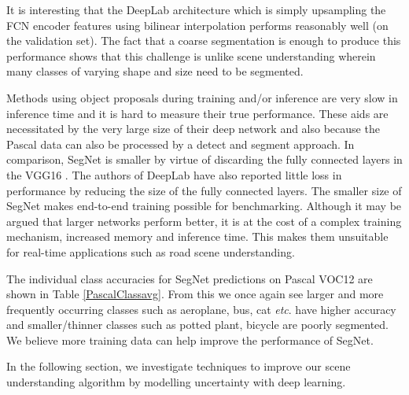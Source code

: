 It is interesting that the DeepLab \citep{chen2016deeplab} architecture which is simply upsampling the FCN encoder features using bilinear interpolation performs reasonably well (on the validation set). The fact that a coarse segmentation is enough to produce this performance shows that this challenge is unlike scene understanding wherein many classes of varying shape and size need to be segmented.

Methods using object proposals during training and/or inference \citep{NohDeconvNets,hariharan2015hypercolumns} are very slow in inference time and it is hard to measure their true performance. These aids are necessitated by the very large size of their deep network \citep{NohDeconvNets} and also because the Pascal data can also be processed by a detect and segment approach. In comparison, SegNet is smaller by virtue of discarding the fully connected layers in the VGG16 \citep{simonyan2014very}. The authors of DeepLab \citep{chen2016deeplab} have also reported little loss in performance by reducing the size of the fully connected layers. The smaller size of SegNet makes end-to-end training possible for benchmarking. Although it may be argued that larger networks perform better, it is at the cost of a complex training mechanism, increased memory and inference time. This makes them unsuitable for real-time applications such as road scene understanding. 

The individual class accuracies for SegNet predictions on Pascal VOC12 are shown in Table \ref{PascalClassavg}. From this we once again see larger and more frequently occurring classes such as aeroplane, bus, cat \textit{etc}. have higher accuracy and smaller/thinner classes such as potted plant, bicycle are poorly segmented. We believe more training data \citep{lin2014microsoft} can help improve the performance of SegNet.

In the following section, we investigate techniques to improve our scene understanding algorithm by modelling uncertainty with deep learning.


\begin{table}[t]
\centering
{}
\caption[Individual class accuracies of SegNet on Pascal VOC12]{Individual class accuracies of SegNet predictions on the Pascal VOC12 segmentation benchmark consisting of 21 object classes.}
\label{PascalClassavg}
\end{table}









